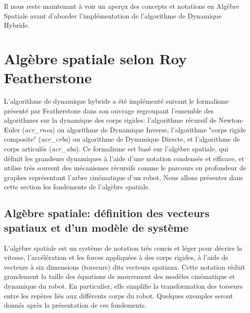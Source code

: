 \documentclass{report}
\begin{document}
Il nous reste maintenant à voir un aperçu des concepts et notations en Algèbre Spatiale avant d'aborder l'implémentation de l'algorithme de Dynamique Hybride.



\chapter{Algèbre spatiale selon Roy Featherstone}


L'algorithme de dynamique hybride a été implémenté suivant le formalisme présenté par Featherstone dans son ouvrage \cite{bib_featherstone} regroupant l'ensemble des algorithmes sur la dynamique des corps rigides: l'algorithme récursif de Newton-Euler (\emph{\gls{acr_rnea}}) ou algorithme de Dynamique Inverse, l'algorithme "corps rigide composite" (\emph{\gls{acr_crba}}) ou algorithme de Dynamique Directe, et l'algorithme de corps articulés (\emph{\gls{acr_aba}}). Ce formalisme est basé sur l'algèbre spatiale, qui définit les grandeurs dynamiques à l'aide d'une notation condensée et efficace, et utilise très souvent des mécanismes récursifs comme le parcours en profondeur de graphes représentant l'arbre cinématique d'un robot. Nous allons présenter dans cette section les fondements de l'algèbre spatiale.\\


\section{Algèbre spatiale: définition des vecteurs spatiaux et d'un modèle de système}

L'algèbre spatiale est un système de notation très concis et léger pour décrire la vitesse, l'accélération et les forces appliquées à des corps rigides, à l'aide de vecteurs à six dimensions (torseurs) dits vecteurs spatiaux. Cette notation réduit grandement la taille des équations de mouvement des modèles cinématique et dynamique du robot. En particulier, elle simplifie la transformation des torseurs entre les repères liés aux différents corps du robot. Quelques exemples seront donnés après la présentation de ces fondements.\\
\end{document}
